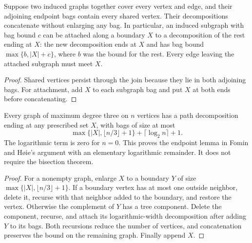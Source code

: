 \begin{theorem}
  \label{thm:lowerbounds-algebraic-endpoint-glue}
  \leanok
  Suppose two induced graphs together cover every vertex and edge, and
  their adjoining endpoint bags contain every shared vertex. Their
  decompositions concatenate without enlarging any bag. In particular,
  an induced subgraph with bag bound $c$ can be attached along a boundary
  $X$ to a decomposition of the rest ending at $X$: the new decomposition
  ends at $X$ and has bag bound $\max\{b,|X|+c\}$, where $b$ was the bound
  for the rest. Every edge leaving the attached subgraph must meet $X$.
\end{theorem}
\begin{proof}
  \leanok
  Shared vertices persist through the join because they lie in both
  adjoining bags. For attachment, add $X$ to each subgraph bag and put
  $X$ at both ends before concatenating.
\end{proof}

\begin{theorem}
  \label{thm:lowerbounds-algebraic-subcubic-endpoint}
  \leanok
  Every graph of maximum degree three on $n$ vertices has a path
  decomposition ending at any prescribed set $X$, with bags of size at most
  \[
    \max\{|X|,\lfloor n/3\rfloor+1\}+\lceil\log_2 n\rceil+1.
  \]
  The logarithmic term is zero for $n=0$. This proves the endpoint lemma
  in Fomin and H{\o}ie's argument with an elementary logarithmic remainder.
  It does not require the bisection theorem.
\end{theorem}
\begin{proof}
  \leanok
  For a nonempty graph, enlarge $X$ to a boundary $Y$ of size
  $\max\{|X|,\lfloor n/3\rfloor+1\}$. If a boundary vertex has at most
  one outside neighbor, delete it, recurse with that neighbor added to
  the boundary, and restore the vertex. Otherwise the complement of $Y$
  has a tree component. Delete the component, recurse, and attach its
  logarithmic-width decomposition after adding $Y$ to its bags. Both
  recursions reduce the number of vertices, and concatenation preserves
  the bound on the remaining graph. Finally append $X$.
\end{proof}

